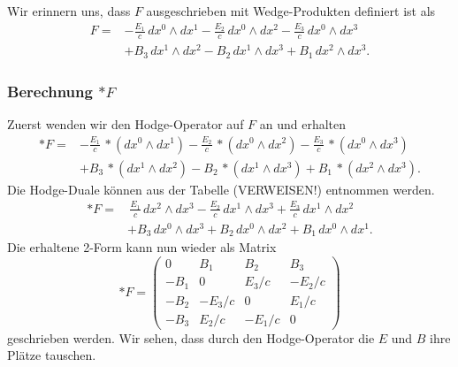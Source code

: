 Wir erinnern uns, dass $F$ ausgeschrieben mit Wedge-Produkten definiert ist als
\begin{align*}
	F = 
	& - \frac{E_{1}}{c} \, dx^0 \wedge dx^1 - \frac{E_{2}}{c} \, dx^0 \wedge dx^2 - \frac{E_{3}}{c} \, dx^0 \wedge dx^3 \\
	& + B_3 \, dx^1 \wedge dx^2 - B_2 \, dx^1 \wedge dx^3 + B_1 \, dx^2 \wedge dx^3.
\end{align*}
\subsubsection{Berechnung $\ast F$}
Zuerst wenden wir den Hodge-Operator auf $F$ an und erhalten
\begin{align*}
	\ast F =
	& - \frac{E_{1}}{c} \, \ast(dx^0 \wedge dx^1) - \frac{E_{2}}{c} \, \ast(dx^0 \wedge dx^2) - \frac{E_{3}}{c} \, \ast(dx^0 \wedge dx^3) \\
	& + B_3 \, \ast(dx^1 \wedge dx^2) - B_2 \, \ast(dx^1 \wedge dx^3) + B_1 \, \ast(dx^2 \wedge dx^3).
\end{align*}
Die Hodge-Duale können aus der Tabelle (VERWEISEN!) entnommen werden.
\begin{align*}
	\ast F =
	& \, \frac{E_{1}}{c} \, dx^2 \wedge dx^3 - \frac{E_{2}}{c} \, dx^1 \wedge dx^3 + \frac{E_{3}}{c} \, dx^1 \wedge dx^2 \\
	& + B_3 \, dx^0 \wedge dx^3 + B_2 \, dx^0 \wedge dx^2 + B_1 \, dx^0 \wedge dx^1.
\end{align*}
Die erhaltene 2-Form kann nun wieder als Matrix
\begin{equation}
	\ast F = \begin{pmatrix}
		0 & B_1 & B_2 & B_3 \\ -B_1 & 0 & E_3/c & -E_2/c \\ -B_2 & -E_3/c & 0 & E_1/c \\ -B_3 & E_2/c & -E_1/c & 0 
	\end{pmatrix}
\end{equation}
geschrieben werden.
Wir sehen, dass durch den Hodge-Operator die $E$ und $B$ ihre Plätze tauschen.
